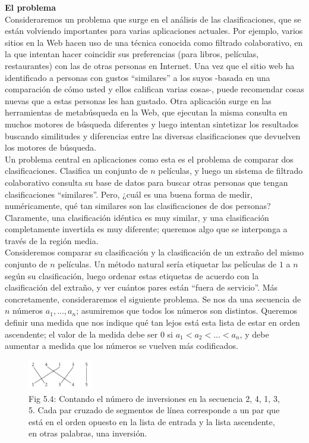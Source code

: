 \documentclass[a4paper, 12pt]{book}
\theoremstyle{dotless}
\begin{document}
\textbf{El problema}\\
Consideraremos un problema que surge en el análisis de las clasificaciones, que se están volviendo importantes para varias aplicaciones actuales. Por ejemplo, varios sitios en la Web hacen uso de una técnica conocida como filtrado colaborativo, en la que intentan hacer coincidir sus preferencias (para libros, películas, restaurantes) con las de otras personas en Internet. Una vez que el sitio web ha identificado a personas con gustos ``similares'' a los suyos -basada en una comparación de cómo usted y ellos califican varias cosas-, puede recomendar cosas nuevas que a estas personas les han gustado. Otra aplicación surge en las herramientas de metabúsqueda en la Web, que ejecutan la misma consulta en muchos motores de búsqueda diferentes y luego intentan sintetizar los resultados buscando similitudes y diferencias entre las diversas clasificaciones que devuelven los motores de búsqueda.\\

Un problema central en aplicaciones como esta es el problema de comparar dos clasificaciones. Clasifica un conjunto de $n$ películas, y luego un sistema de filtrado colaborativo consulta su base de datos para buscar otras personas que tengan clasificaciones ``similares''. Pero, ¿cuál es una buena forma de medir, numéricamente, qué tan similares son las clasificaciones de dos personas? Claramente, una clasificación idéntica es muy similar, y una clasificación completamente invertida es muy diferente; queremos algo que se interponga a través de la región media.\\

Consideremos comparar su clasificación y la clasificación de un extraño del mismo conjunto de $n$ películas. Un método natural sería etiquetar las películas de $1$ a $n$ según su clasificación, luego ordenar estas etiquetas de acuerdo con la clasificación del extraño, y ver cuántos pares están ``fuera de servicio''. Más concretamente, consideraremos el siguiente problema. Se nos da una secuencia de $n$ números $a_1, ..., a_n$; asumiremos que todos los números son distintos. Queremos definir una medida que nos indique qué tan lejos está esta lista de estar en orden ascendente; el valor de la medida debe ser $0$ si $a_1 <a_2 <... <a_n$, y debe aumentar a medida que los números se vuelven más codificados.\\

\begin{figure}
\includegraphics[width=0.25\textwidth]{Imagenes-Seccion5/fig5_4.PNG}
\caption{ Fig 5.4: Contando el número de inversiones en la secuencia 2, 4, 1, 3, 5. Cada par cruzado de segmentos de línea corresponde a un par que está en el orden opuesto en la lista de entrada y la lista ascendente, en otras palabras, una inversión.}
 \label{fig:Imagenes-Seccion5/fig5_4.PNG}
\end{figure}
\end{document}
